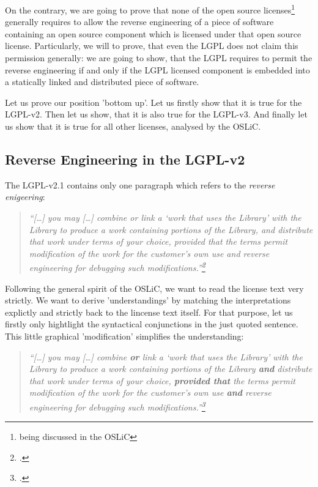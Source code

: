 On the contrary, we are going to prove that none of the open source
licenses\footnote{being discussed in the OSLiC} generally requires to allow the
reverse engineering of a piece of software containing an open source component
which is licensed under that open source license. Particularly, we will to
prove, that even the LGPL does not claim this permission generally: we are going
to show, that the LGPL requires to permit the reverse engineering if and only if 
the LGPL licensed component is embedded into a statically linked and
distributed piece of software.

Let us prove our position 'bottom up'. Let us firstly show that it is true for
the LGPL-v2. Then let us show, that it is also true for the LGPL-v3. And finally
let us show that it is true for all other licenses, analysed by the OSLiC.

\subsection{Reverse Engineering in the LGPL-v2}
The LGPL-v2.1 contains only one paragraph which refers to the \emph{reverse
enigeering}:

\begin{quote}\noindent\emph{\enquote{[\ldots] you may [\ldots] combine or link a
\enquote{work that uses the Library} with the Library to produce a work
containing portions of the Library, and distribute that work under terms of your
choice, provided that the terms permit modification of the work for the
customer's own use and \emph{reverse engineering} for debugging such
modifications.}\footcite[cf.][\nopage wp]{Lgpl21OsiLicense1999a}}
\end{quote}

Following the general spirit of the OSLiC, we want to read the license text very
strictly. We want to derive 'understandings' by matching the interpretations
explictly and strictly back to the lincense text itself. For that purpose, let
us firstly only hightlight the syntactical conjunctions in the just quoted
sentence. This little graphical 'modification' simplifies the understanding:

\begin{quote}\noindent\emph{\enquote{[\ldots] you may [\ldots] combine
\textbf{or} link a \enquote{work that uses the Library} with the Library to
produce a work containing portions of the Library \textbf{and} distribute that
work under terms of your choice, \textbf{provided that} the terms permit
modification of the work for the customer's own use \textbf{and} \emph{reverse
engineering} for debugging such modifications.}\footcite[cf.][\nopage wp. herv.
KR.]{Lgpl21OsiLicense1999a}}
\end{quote}

